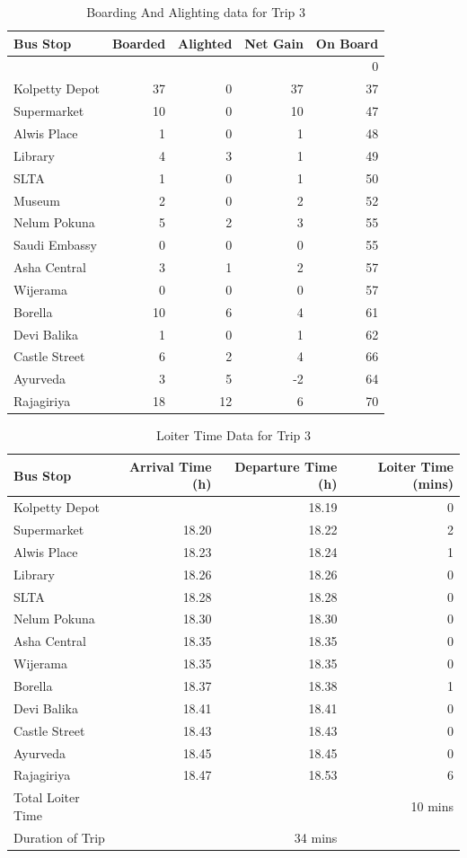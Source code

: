\documentclass[12pt, oneside]{report}
\begin{document}
\begin{table}
\centering
\begin{tabular}{|l|r|r|r|r|}
\hline
Bus Stop & Boarded & Alighted & Net Gain & On Board \\
\hline
 & & & & 0 \\
Kolpetty Depot	&37	&0	&37	&37\\
Supermarket	&10	&0	&10	&47\\
Alwis Place	&1	&0	&1	&48\\
Library	&4	&3	&1	&49\\
SLTA	&1	&0	&1	&50\\
\rowcolor[gray]{0.7}
Museum	&2	&0	&2	&52\\
Nelum Pokuna	&5	&2	&3	&55\\
Saudi Embassy	&0	&0	&0	&55\\
Asha Central	&3	&1	&2	&57\\
Wijerama	&0	&0	&0	&57\\
Borella	&10	&6	&4	&61\\
Devi Balika	&1	&0	&1	&62\\
Castle Street	&6	&2	&4	&66\\
Ayurveda	&3	&5	&-2	&64\\
Rajagiriya	&18	&12	&6	&70\\
\hline
\end{tabular}
\caption{Boarding And Alighting data for Trip 3}
\label{table-trip3-BoardingAndAlighting}
\end{table}

\begin{table}
\centering
\begin{tabular}{|l|r|r|r|}
\hline
Bus Stop & Arrival Time (h) & Departure Time (h) & Loiter Time (mins) \\
\hline
Kolpetty Depot	&	&18.19	&0\\
Supermarket	&18.20	&18.22	&2\\
Alwis Place	&18.23	&18.24	&1\\
Library	&18.26	&18.26	&0\\
SLTA	&18.28	&18.28	&0\\
Nelum Pokuna	&18.30	&18.30	&0\\
Asha Central	&18.35	&18.35	&0\\
Wijerama	&18.35	&18.35	&0\\
Borella	&18.37	&18.38	&1\\
Devi Balika	&18.41	&18.41	&0\\
Castle Street	&18.43	&18.43	&0\\
Ayurveda	&18.45	&18.45	&0\\
Rajagiriya	&18.47	&18.53	&6\\
\hline
Total Loiter Time & & & 10 mins \\
Duration of Trip & & 34 mins & \\
\hline
\end{tabular}
\caption{Loiter Time Data for Trip 3}
\label{table-trip3-LoiterTime}
\end{table}
\end{document}
